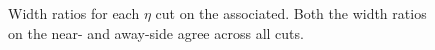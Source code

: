 \documentclass[../main.tex]{subfiles}
\begin{document}
\begin{figure}[h]%
    \centering
    \caption{Width ratios for each $\eta$ cut on the associated. Both the width ratios on the near- and away-side agree across all cuts.}%
    \label{fig:width_ratios}%
\end{figure}
\end{document}
